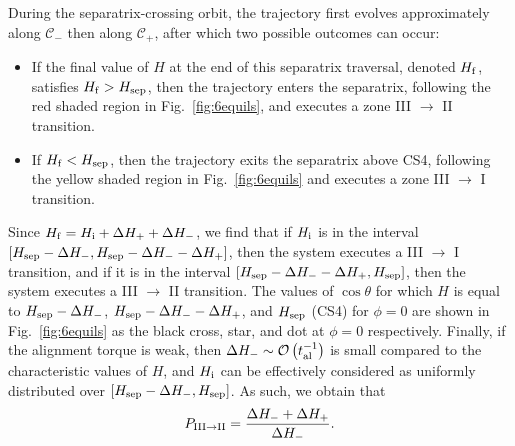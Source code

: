 \documentclass[
        fleqn,
        usenatbib,
    ]{mnras}
\newcommand*{\p}[1]{\left(#1\right)}
\newcommand*{\s}[1]{\left[#1\right]}
\begin{document}
During the separatrix-crossing orbit, the trajectory first evolves
approximately along $\mathcal{C}_-$ then along $\mathcal{C}_+$, after which two
possible outcomes can occur:
\begin{itemize}
    \item If the final value of $H$ at the end of this separatrix traversal,
        denoted $H_{\rm f}$, satisfies $H_{\rm f} > H_{\rm sep}$, then the
        trajectory enters the separatrix, following the red shaded region in
        Fig.~\ref{fig:6equils}, and executes a zone III $\to$ II transition.

    \item If $H_{\rm f} < H_{\rm sep}$, then the trajectory exits the separatrix
        above CS4, following the yellow shaded region in Fig.~\ref{fig:6equils}
        and executes a zone III $\to$ I transition.
\end{itemize}
Since $H_{\rm f} = H_{\rm i} + \Delta H_+ + \Delta H_-$, we find that if $H_{\rm
i}$ is in the interval $\s{H_{\rm sep} - \Delta H_-, H_{\rm sep} - \Delta H_{-}
- \Delta H_+}$, then the system executes a III $\to$ I transition, and if it
is in the interval $\s{H_{\rm sep} - \Delta H_- - \Delta H_+, H_{\rm sep}}$,
then the system executes a III $\to$ II transition. The values of $\cos
\theta$ for which $H$ is equal to $H_{\rm sep} - \Delta H_-$, $H_{\rm sep} - \Delta
H_- - \Delta H_+$, and $H_{\rm sep}$ (CS4) for $\phi = 0$ are shown in
Fig.~\ref{fig:6equils} as the black cross, star, and dot at $\phi = 0$
respectively. Finally, if the alignment torque is weak, then $\Delta H_- \sim
\mathcal{O}\p{t_{\rm al}^{-1}}$ is small compared to the characteristic values of
$H$, and $H_{\rm i}$ can be effectively considered as uniformly distributed over
$\s{H_{\rm sep} - \Delta H_-, H_{\rm sep}}$. As such, we obtain that
\begin{equation}
    P_{\rm III \to II} = \frac{\Delta H_- + \Delta H_+}{\Delta H_-}.
        \label{eq:def_P32_toy}
\end{equation}
\end{document}
